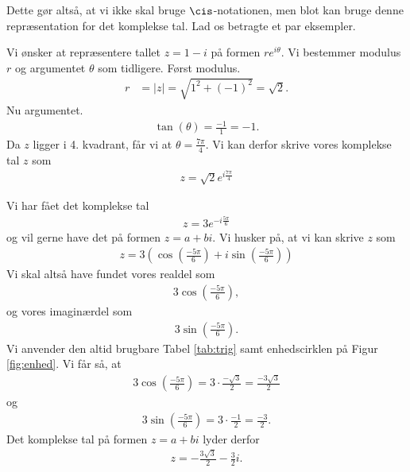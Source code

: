 \documentclass[12pt]{article}
\begin{document}
Dette gør altså, at vi ikke skal bruge $\cis$-notationen, men blot kan bruge denne repræsentation for det komplekse tal. 
Lad os betragte et par eksempler.
\begin{exa}
	Vi ønsker at repræsentere tallet $z = 1 - i$ på formen $re^{i\theta}$. Vi bestemmer modulus $r$ og argumentet 
	$\theta$ som tidligere. Først modulus.
	\begin{align*}
		r &= |z| = \sqrt{1^2 + (-1)^2} = \sqrt{2}.
	\end{align*}
	Nu argumentet.
	\begin{align*}
		\tan(\theta) = \frac{-1}{1} = -1.
	\end{align*}
	Da $z$ ligger i 4. kvadrant, får vi at $\theta = \frac{7\pi}{4}$. 
	Vi kan derfor skrive vores komplekse tal $z$ som
	\begin{align*}
		z = \sqrt{2}e^{i \frac{7 \pi}{4}}
	\end{align*}
\end{exa}	
\begin{exa}
	Vi har fået det komplekse tal 
	\begin{align*}
		z = 3e^{-i\frac{5\pi}{6}}
	\end{align*}
	og vil gerne have det på formen $z = a + bi$. Vi husker på, at vi kan skrive $z$ som
	\begin{align*}
		z = 3\left(\cos\left(\frac{-5\pi}{6}\right) + i \sin\left(\frac{-5\pi}{6}\right)\right)
	\end{align*}
	Vi skal altså have fundet vores realdel som 
	\begin{align*}
		3\cos\left(\frac{-5\pi}{6}\right),
	\end{align*}
	og vores imaginærdel som
	\begin{align*}
		3\sin\left(\frac{-5\pi}{6}\right).
	\end{align*}
	Vi anvender den altid brugbare Tabel \ref{tab:trig} samt enhedscirklen på Figur \ref{fig:enhed}.
	Vi får så, at 
	\begin{align*}
		3\cos\left(\frac{-5\pi}{6}\right) = 3\cdot \frac{-\sqrt{3}}{2} = \frac{-3\sqrt{3}}{2}
	\end{align*}
	og 
	\begin{align*}
		3\sin\left(\frac{-5\pi}{6}\right) = 3\cdot \frac{-1}{2} = \frac{-3}{2}.
	\end{align*}
	Det komplekse tal på formen $z = a + bi$ lyder derfor
	\begin{align*}
		z = -\frac{3\sqrt{3}}{2} - \frac{3}{2}i.
	\end{align*}
\end{exa}
\end{document}
